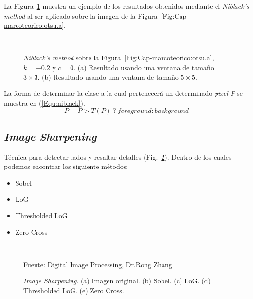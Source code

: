 	La Figura~\ref{Fig:Cap-marcoteorico:niblack} muestra un ejemplo de los 
	resultados obtenidos mediante el \textit{Niblack's method} al ser aplicado
	sobre la imagen de la Figura~\ref{Fig:Cap-marcoteorico:otsu.a}.%
		
	\begin{figure}[h!]
	\centering
	\setlength{\fboxsep}{0pt}
   { }
   \\
	\caption[\textit{Niblack's method}]{\textit{Niblack's method} sobre la
	Figura~\ref{Fig:Cap-marcoteorico:otsu.a}, $k=-0.2$ y $c=0$. (a) Resultado
	usando una ventana de tamaño $3\times 3$. (b) Resultado usando una ventana 
	de tamaño $5\times 5$.}
	\label{Fig:Cap-marcoteorico:niblack}
	\end{figure}
	
	La forma de determinar la clase a la cual pertenecerá un determinado
	\textit{pixel} $P$ se muestra en (\ref{Equ:niblack}).
	\begin{equation}
		P = P > T(P) ~?~ \textit{foreground} : \textit{background}
		\label{Equ:niblack}
	\end{equation}	
	
\subsection{\textit{Image Sharpening}}
	Técnica para detectar lados y resaltar detalles (Fig.~\ref{Fig:Sharpening}).
Dentro de los cuales podemos encontrar los siguiente métodos:
	\begin{itemize}
		\item Sobel
    \item LoG
    \item Thresholded LoG
    \item Zero Cross
  \end{itemize}

  \begin{figure}[h!]
		\centering
     { }
    \\
     { }
    \caption[\textit{Image Sharpening}]{\textit{Image Sharpening}. (a) Imagen 
    original. (b) Sobel. (c) LoG. (d) Thresholded LoG. (e) Zero Cross.} 
    \tiny{Fuente: Digital Image Processing, Dr.Rong Zhang}
    \label{Fig:Sharpening}
	\end{figure}    

